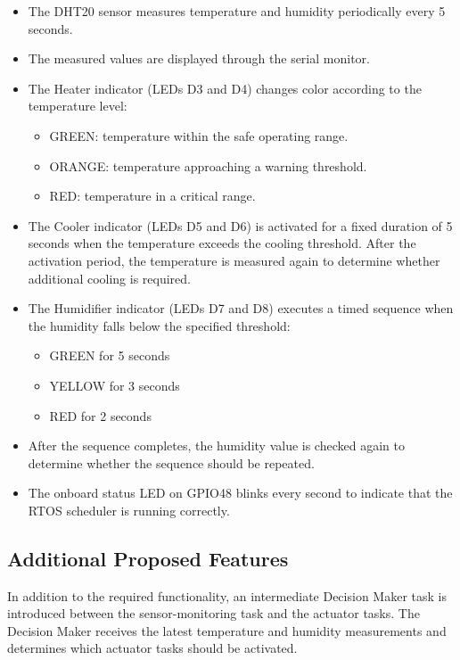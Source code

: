 \begin{itemize}
  \item The DHT20 sensor measures temperature and humidity periodically every 5 seconds.
  \item The measured values are displayed through the serial monitor.
  \item The Heater indicator (LEDs D3 and D4) changes color according to the temperature level:

        \begin{itemize}
          \item GREEN: temperature within the safe operating range.
          \item ORANGE: temperature approaching a warning threshold.
          \item RED: temperature in a critical range.
        \end{itemize}
  \item The Cooler indicator (LEDs D5 and D6) is activated for a fixed duration of 5 seconds when the temperature exceeds the
        cooling threshold. After the activation period, the temperature is measured again to determine whether additional
        cooling is required.
  \item The Humidifier indicator (LEDs D7 and D8) executes a timed sequence when the humidity falls below the specified
        threshold:

        \begin{itemize}
          \item GREEN for 5 seconds
          \item YELLOW for 3 seconds
          \item RED for 2 seconds
        \end{itemize}
  \item After the sequence completes, the humidity value is checked again to determine whether the sequence should be repeated.
  \item The onboard status LED on GPIO48 blinks every second to indicate that the RTOS scheduler is running correctly.
\end{itemize}

\subsection{Additional Proposed Features}

In addition to the required functionality, an intermediate Decision Maker task is introduced between the
sensor-monitoring task and the actuator tasks. The Decision Maker receives the latest temperature and humidity
measurements and determines which actuator tasks should be activated.

